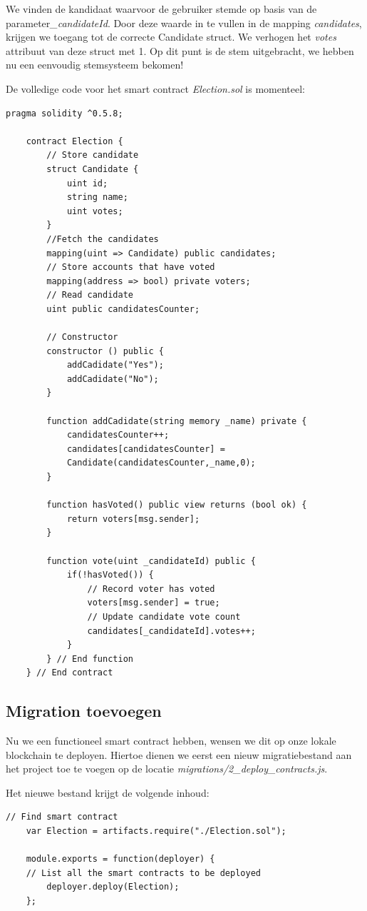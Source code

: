 	We vinden de kandidaat waarvoor de gebruiker stemde op basis van de parameter\textit{\_candidateId}. Door deze waarde in te vullen in de mapping \textit{candidates}, krijgen we toegang tot de correcte Candidate struct. We verhogen het \textit{votes} attribuut van deze struct met 1. Op dit punt is de stem uitgebracht, we hebben nu een eenvoudig stemsysteem bekomen!
	
	De volledige code voor het smart contract \textit{Election.sol} is momenteel:
	
	\lstset{language=JavaScriptSolidity} 
	\begin{lstlisting}[frame=single,  label={lst:election}] 
	pragma solidity ^0.5.8;
	
	contract Election {
		// Store candidate
		struct Candidate {
			uint id;
			string name;
			uint votes;
		}
		//Fetch the candidates
		mapping(uint => Candidate) public candidates;
		// Store accounts that have voted
		mapping(address => bool) private voters;
		// Read candidate
		uint public candidatesCounter;
		
		// Constructor
		constructor () public {
			addCadidate("Yes");
			addCadidate("No");
		}
	
		function addCadidate(string memory _name) private {
			candidatesCounter++;
			candidates[candidatesCounter] = 
			Candidate(candidatesCounter,_name,0);
		}
		
		function hasVoted() public view returns (bool ok) {
			return voters[msg.sender];
		}
		
		function vote(uint _candidateId) public {
			if(!hasVoted()) {
				// Record voter has voted
				voters[msg.sender] = true;
				// Update candidate vote count
				candidates[_candidateId].votes++;
			}
		} // End function
	} // End contract
	\end{lstlisting}
	
	
	\subsection{Migration toevoegen}
	Nu we een functioneel smart contract hebben, wensen we dit op onze lokale blockchain te deployen. Hiertoe dienen we eerst een nieuw migratiebestand aan het project toe te voegen op de locatie \textit{migrations\slash 2\_deploy\_contracts.js}.  
	
	Het nieuwe bestand krijgt de volgende inhoud:
	
	\begin{lstlisting}[frame=single]
	// Find smart contract
	var Election = artifacts.require("./Election.sol");
	
	module.exports = function(deployer) {
	// List all the smart contracts to be deployed
		deployer.deploy(Election);
	};
	\end{lstlisting}
	
